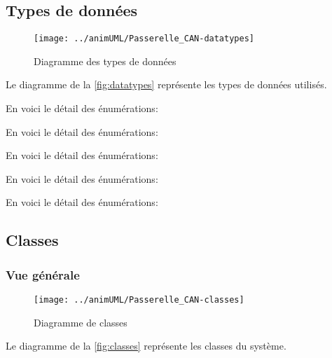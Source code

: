 \subsection{Types de données}

\begin{figure}[H]
	\centering
	\texttt{[image: ../animUML/Passerelle\_CAN-datatypes]}
	\caption{Diagramme des types de données}
	\label{fig:datatypes}
\end{figure}
Le diagramme de la \autoref{fig:datatypes} représente les types de données utilisés.
\newline


En voici le détail des énumérations:
\enumIdScreenPopUpLiteralDescriptions



En voici le détail des énumérations:
\enumProgramStateLiteralDescriptions



En voici le détail des énumérations:
\enumNetworkStateLiteralDescriptions



En voici le détail des énumérations:
\enumSenderModeLiteralDescriptions



En voici le détail des énumérations:
\enumSendingStateLiteralDescriptions



\subsection{Classes}

\subsubsection{Vue générale}

\begin{figure}[H]
	\centering
	\texttt{[image: ../animUML/Passerelle\_CAN-classes]}
	\caption{Diagramme de classes}
	\label{fig:classes}
\end{figure}
Le diagramme de la \autoref{fig:classes} représente les classes du système.

